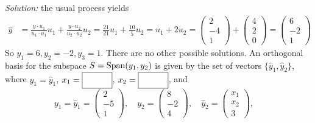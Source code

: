    \ifnum {} {\color{DarkBlue} \textit{Solution:} the usual process yields
    \begin{align}
        \hat y 
        &= \frac{y\cdot u_1}{u_1 \cdot u_1}u_1 + \frac{y\cdot u_2}{u_2 \cdot u_2}u_2 
        = \frac{21}{21}u_1 + \frac{10}{5}u_2 = u_1 + 2u_2 
        =  \begin{pmatrix} 2\\-4\\1\end{pmatrix} + \begin{pmatrix} 4\\2\\0\end{pmatrix} 
        = \begin{pmatrix} 6\\-2\\1\end{pmatrix}
    \end{align}
    So $y_1=6, y_2=-2, y_3=1$. There are no other possible solutions. } \fi    
\fi 
\ifnum {}
    An orthogonal basis for the subspace $S = \text{Span} (y_1, y_2)$ is given by the set of vectors $\{\hat y_1, \hat y_2\}$, where $y_1 = \hat y_1$, $x_1 = \framebox{\strut\hspace{1cm}}$, $x_2 = \framebox{\strut\hspace{1cm}}$, and 
    $$
    y_1 = \hat y_1 = \begin{pmatrix} 2\\-5\\1\end{pmatrix}, \quad 
    y_2 = \begin{pmatrix} 8\\-2\\4\end{pmatrix}, \quad 
    \hat y_2 = \begin{pmatrix} x_1\\x_2\\ 3 \end{pmatrix}, \quad 
    $$
    
